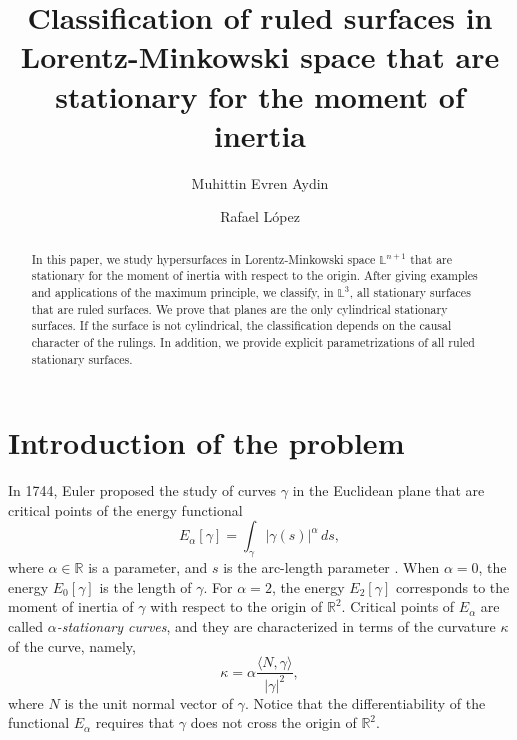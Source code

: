 \documentclass[a4paper,12pt]{amsart}
\theoremstyle{definition}
\def\r{\mathbb R}
\def\l{\mathbb L}
\begin{document}
\title[Ruled stationary surfaces in Lorentz-Minkowski space]{Classification of ruled surfaces in Lorentz-Minkowski space that are stationary for the moment of inertia}
\author{Muhittin Evren Aydin}
\address{Department of Mathematics, Faculty of Science, Firat University, Elazig,  23200 Turkey}
\author{Rafael L\'opez}
\address{Departamento de Geometr\'{\i}a y Topolog\'{\i}a Universidad de Granada 18071 Granada, Spain}
   \begin{abstract}
In this paper, we study hypersurfaces  in Lorentz-Minkowski space $\l^{n+1}$ that are stationary for the  moment of inertia with respect to the origin. After giving examples and applications of the maximum principle, we classify, in $\l^3$, all stationary surfaces that are ruled surfaces. We prove that planes are the only cylindrical stationary surfaces. If the surface is not cylindrical, the classification depends on the causal character of the rulings. In addition, we provide explicit parametrizations of all ruled stationary surfaces.  
\end{abstract}

 

\maketitle
\section{Introduction of the problem}

In 1744, Euler proposed the study of curves $\gamma$ in the Euclidean plane that are critical points of the energy functional
\begin{equation}\label{Eu1}
E_{\alpha}[\gamma]=\int_\gamma |\gamma(s)|^\alpha\, ds,
\end{equation}
where $\alpha\in\r$ is a parameter,  and $s$ is the arc-length parameter \cite{eu}.  When $\alpha=0$, the energy $E_0[\gamma]$ is the  length of $\gamma$. For  $\alpha=2$, the energy $E_2[\gamma]$ corresponds to the moment of inertia of $\gamma$ with respect to the origin   of $\r^2$. Critical points of $E_\alpha$ are called {\it $\alpha$-stationary curves}, and they are characterized in terms of the curvature $\kappa$ of the curve, namely,  
\begin{equation}\label{Eu2}
\kappa =\alpha\frac{\langle N ,\gamma \rangle}{|\gamma|^2},
\end{equation}
where  $N$ is the unit normal vector of $\gamma$.  Notice that the differentiability of the functional $E_\alpha$ requires  that $\gamma$ does not cross the origin of $\r^2$. 
\end{document}
